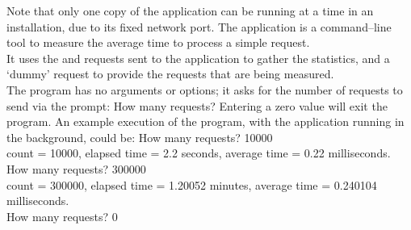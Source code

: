 Note that only one copy of the  application can be
running at a time in an \mplusm{} installation, due to its fixed \yarp{} network port.
The  application is a command--line tool to
measure the average time to process a simple request.\\

It uses the  and
 requests sent to the
 application to gather the statistics, and a
`dummy' request to provide the requests that are being measured.\\

The program has no arguments or options; it asks for the number of requests to send via
the prompt:
\outputBegin{}
How many requests?
\outputEnd{}
Entering a zero value will exit the program.
An example execution of the program, with the 
application running in the background, could be:
\outputBegin{}
How many requests? 10000\\
count = 10000, elapsed time = 2.2 seconds, average time = 0.22 milliseconds.\\
How many requests? 300000\\
count = 300000, elapsed time = 1.20052 minutes, average time = 0.240104 milliseconds.\\
How many requests? 0\\
\outputEnd{}
\secondaryEnd{}
\primaryEnd{}
